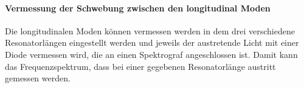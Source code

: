 \paragraph{Vermessung der Schwebung zwischen den longitudinal Moden}
Die longitudinalen Moden können vermessen werden in dem drei verschiedene Resonatorlängen 
eingestellt werden und jeweils der austretende Licht mit einer Diode vermessen wird, die an einen 
Spektrograf angeschlossen ist. Damit kann das Frequenzspektrum, dass bei einer gegebenen Resonatorlänge 
austritt gemessen werden.  


